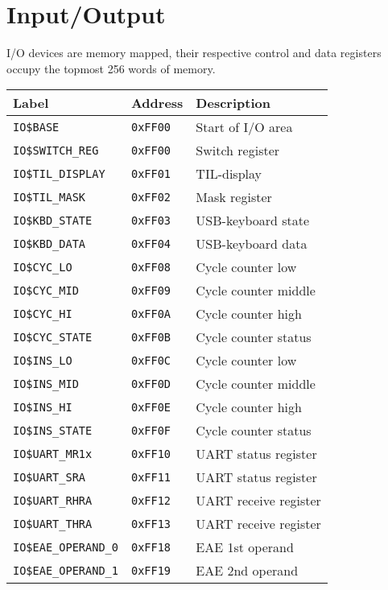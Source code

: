 \documentclass{leaflet}
\begin{document}
 \section{Input/Output}
  I/O devices are memory mapped, their respective control and data registers 
  occupy the topmost 256 words of memory.
  {\scriptsize
   \begin{center}
    \begin{longtable}{|l|l|l|}
     \hline
     Label&Address&Description\\
     \hline
     \hline
     \texttt{IO\$BASE}&\texttt{0xFF00}&Start of I/O area\\
     \hline
     \texttt{IO\$SWITCH\_REG}&\texttt{0xFF00}&Switch register\\
     \texttt{IO\$TIL\_DISPLAY}&\texttt{0xFF01}&TIL-display\\
     \texttt{IO\$TIL\_MASK}&\texttt{0xFF02}&Mask register\\
     \texttt{IO\$KBD\_STATE}&\texttt{0xFF03}&USB-keyboard state\\
     \texttt{IO\$KBD\_DATA}&\texttt{0xFF04}&USB-keyboard data\\
     \hline
     \texttt{IO\$CYC\_LO}&\texttt{0xFF08}&Cycle counter low\\
     \texttt{IO\$CYC\_MID}&\texttt{0xFF09}&Cycle counter middle\\
     \texttt{IO\$CYC\_HI}&\texttt{0xFF0A}&Cycle counter high\\
     \texttt{IO\$CYC\_STATE}&\texttt{0xFF0B}&Cycle counter status\\
     \texttt{IO\$INS\_LO}&\texttt{0xFF0C}&Cycle counter low\\
     \texttt{IO\$INS\_MID}&\texttt{0xFF0D}&Cycle counter middle\\
     \texttt{IO\$INS\_HI}&\texttt{0xFF0E}&Cycle counter high\\
     \texttt{IO\$INS\_STATE}&\texttt{0xFF0F}&Cycle counter status\\
     \hline
     \texttt{IO\$UART\_MR1x}&\texttt{0xFF10}&UART status register\\
     \texttt{IO\$UART\_SRA}&\texttt{0xFF11}&UART status register\\
     \texttt{IO\$UART\_RHRA}&\texttt{0xFF12}&UART receive register\\
     \texttt{IO\$UART\_THRA}&\texttt{0xFF13}&UART receive register\\
     \hline
     \texttt{IO\$EAE\_OPERAND\_0}&\texttt{0xFF18}&EAE 1st operand\\
     \texttt{IO\$EAE\_OPERAND\_1}&\texttt{0xFF19}&EAE 2nd operand\\

\end{longtable}
\end{center}}
\end{document}
